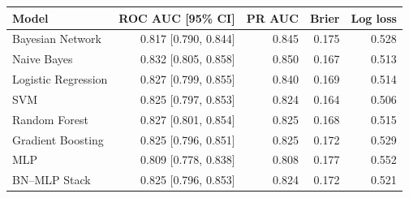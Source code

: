 \begin{tabular}{lrrrr}
\toprule
Model & ROC AUC [95\% CI] & PR AUC & Brier & Log loss \\
\midrule
Bayesian Network & 0.817 [0.790, 0.844] & 0.845 & 0.175 & 0.528 \\
Naive Bayes & 0.832 [0.805, 0.858] & 0.850 & 0.167 & 0.513 \\
Logistic Regression & 0.827 [0.799, 0.855] & 0.840 & 0.169 & 0.514 \\
SVM & 0.825 [0.797, 0.853] & 0.824 & 0.164 & 0.506 \\
Random Forest & 0.827 [0.801, 0.854] & 0.825 & 0.168 & 0.515 \\
Gradient Boosting & 0.825 [0.796, 0.851] & 0.825 & 0.172 & 0.529 \\
MLP & 0.809 [0.778, 0.838] & 0.808 & 0.177 & 0.552 \\
BN--MLP Stack & 0.825 [0.796, 0.853] & 0.824 & 0.172 & 0.521 \\
\bottomrule
\end{tabular}
